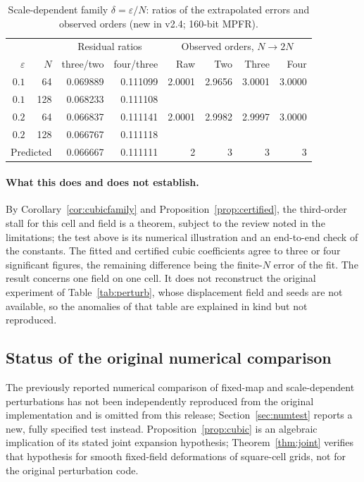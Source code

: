 \documentclass[11pt]{article}
\theoremstyle{remark}
\begin{document}
\begin{table}[ht]
\centering
\begin{tabular}{rrrrrrrr}
\toprule
& & \multicolumn{2}{c}{Residual ratios} & \multicolumn{4}{c}{Observed orders, $N\to2N$}\\
$\varepsilon$ & $N$ & three/two & four/three & Raw & Two & Three & Four\\
\midrule
$0.1$ & 64 & 0.069889 & 0.111099 & 2.0001 & 2.9656 & 3.0001 & 3.0000\\
$0.1$ & 128 & 0.068233 & 0.111108 & & & & \\
$0.2$ & 64 & 0.066837 & 0.111141 & 2.0001 & 2.9982 & 2.9997 & 3.0000\\
$0.2$ & 128 & 0.066767 & 0.111118 & & & & \\
\midrule
\multicolumn{2}{l}{Predicted} & 0.066667 & 0.111111 & 2 & 3 & 3 & 3\\
\bottomrule
\end{tabular}
\caption{Scale-dependent family $\delta=\varepsilon/N$: ratios of the extrapolated errors
and observed orders (new in v2.4; 160-bit MPFR).}\label{tab:ratios}
\end{table}

\paragraph{What this does and does not establish.}
By Corollary~\ref{cor:cubicfamily} and Proposition~\ref{prop:certified}, the third-order stall
for this cell and field is a theorem, subject to the review noted in the limitations; the
test above is its numerical illustration and an end-to-end check of the constants. The
fitted and certified cubic coefficients agree to three or four significant figures, the
remaining difference being the finite-$N$ error of the fit. The result concerns one field on
one cell. It does not reconstruct the original experiment of Table~\ref{tab:perturb}, whose
displacement field and seeds are not available, so the anomalies of that table are explained
in kind but not reproduced.

\subsection{Status of the original numerical comparison}
The previously reported numerical comparison of fixed-map and scale-dependent
perturbations has not been independently reproduced from the original
implementation and is omitted from this release; Section~\ref{sec:numtest} reports a new,
fully specified test instead. Proposition~\ref{prop:cubic} is an algebraic implication of
its stated joint expansion hypothesis; Theorem~\ref{thm:joint} verifies that hypothesis for
smooth fixed-field deformations of square-cell grids, not for the original perturbation code.
\end{document}
